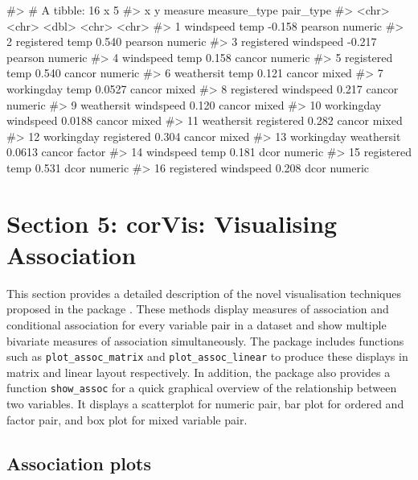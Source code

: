 \begin{Schunk}
\begin{Soutput}
#> # A tibble: 16 x 5
#>    x          y          measure measure_type pair_type
#>    <chr>      <chr>        <dbl> <chr>        <chr>    
#>  1 windspeed  temp       -0.158  pearson      numeric  
#>  2 registered temp        0.540  pearson      numeric  
#>  3 registered windspeed  -0.217  pearson      numeric  
#>  4 windspeed  temp        0.158  cancor       numeric  
#>  5 registered temp        0.540  cancor       numeric  
#>  6 weathersit temp        0.121  cancor       mixed    
#>  7 workingday temp        0.0527 cancor       mixed    
#>  8 registered windspeed   0.217  cancor       numeric  
#>  9 weathersit windspeed   0.120  cancor       mixed    
#> 10 workingday windspeed   0.0188 cancor       mixed    
#> 11 weathersit registered  0.282  cancor       mixed    
#> 12 workingday registered  0.304  cancor       mixed    
#> 13 workingday weathersit  0.0613 cancor       factor   
#> 14 windspeed  temp        0.181  dcor         numeric  
#> 15 registered temp        0.531  dcor         numeric  
#> 16 registered windspeed   0.208  dcor         numeric
\end{Soutput}
\end{Schunk}

\hypertarget{section-5-corvis-visualising-association}{%
\section{Section 5: corVis: Visualising
Association}\label{section-5-corvis-visualising-association}}

This section provides a detailed description of the novel visualisation
techniques proposed in the package . These methods
display measures of association and conditional association for every
variable pair in a dataset and show multiple bivariate measures of
association simultaneously. The package includes functions such as
\texttt{plot\_assoc\_matrix} and \texttt{plot\_assoc\_linear} to produce
these displays in matrix and linear layout respectively. In addition,
the package also provides a function \texttt{show\_assoc} for a quick
graphical overview of the relationship between two variables. It
displays a scatterplot for numeric pair, bar plot for ordered and factor
pair, and box plot for mixed variable pair.

\hypertarget{association-plots}{%
\subsection{Association plots}\label{association-plots}}

